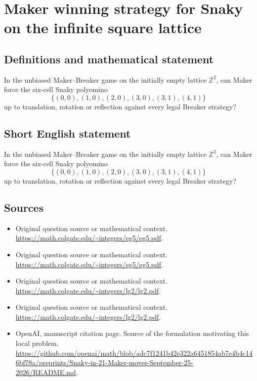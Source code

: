 \documentclass[11pt]{article}
\begin{document}
\section*{Maker winning strategy for Snaky on the infinite square lattice}\label{30007104}
\subsection{Definitions and mathematical statement}
In the unbiased Maker–Breaker game on the initially empty lattice $\mathbb Z^2$, can Maker force the six-cell Snaky polyomino
\[\{(0,0),(1,0),(2,0),(3,0),(3,1),(4,1)\}\]
up to translation, rotation or reflection against every legal Breaker strategy?
\subsection{Short English statement}
In the unbiased Maker–Breaker game on the initially empty lattice $\mathbb Z^2$, can Maker force the six-cell Snaky polyomino
\[\{(0,0),(1,0),(2,0),(3,0),(3,1),(4,1)\}\]
up to translation, rotation or reflection against every legal Breaker strategy?
\subsection{Sources}
\begin{itemize}
\item[S1] Original question source or mathematical context.
\url{https://math.colgate.edu/~integers/eg5/eg5.pdf}.
\item[S2] Original question source or mathematical context.
\url{https://math.colgate.edu/~integers/eg5/eg5.pdf}.
\item[S3] Original question source or mathematical context.
\url{https://math.colgate.edu/~integers/lg2/lg2.pdf}.
\item[S4] Original question source or mathematical context.
\url{https://math.colgate.edu/~integers/lg2/lg2.pdf}.
\item[S5] OpenAI, manuscript citation page. Source of the formulation motivating this local problem.
\url{https://github.com/openai/math/blob/adc7f1241b42e322a6451854ab7e4b4c146bf78a/preprints/Snaky-in-21-Maker-moves-September-25-2026/README.md}.
\end{itemize}
\end{document}
